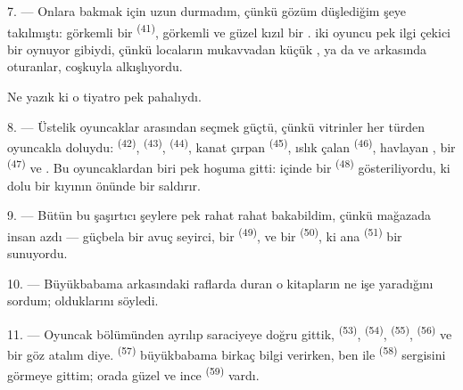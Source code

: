 7. --- Onlara bakmak için uzun durmadım, çünkü gözüm düşlediğim şeye
takılmıştı: görkemli bir  \textsuperscript{(41)},
görkemli  ve güzel kızıl bir .
 iki oyuncu pek ilgi çekici bir 
 oynuyor gibiydi, çünkü locaların mukavvadan küçük
, ya da  ve 
 arkasında oturanlar, coşkuyla alkışlıyordu.

Ne yazık ki o tiyatro pek pahalıydı.

8. --- Üstelik oyuncaklar arasından seçmek güçtü, çünkü vitrinler her türden
oyuncakla doluydu:  \textsuperscript{(42)},
 \textsuperscript{(43)}, 
\textsuperscript{(44)}, kanat çırpan 
\textsuperscript{(45)}, ıslık çalan 
\textsuperscript{(46)}, havlayan , bir 
\textsuperscript{(47)} ve . Bu oyuncaklardan biri pek
hoşuma gitti: içinde bir  \textsuperscript{(48)}
gösteriliyordu, ki  dolu bir kıyının
önünde  bir  saldırır.


9. --- Bütün bu şaşırtıcı şeylere pek rahat rahat bakabildim, çünkü mağazada
insan azdı --- güçbela bir avuç seyirci, bir 
\textsuperscript{(49)}, ve bir  \textsuperscript{(50)}, ki
ana  \textsuperscript{(51)} bir  sunuyordu.

10. --- Büyükbabama  arkasındaki raflarda duran o kitapların
ne işe yaradığını sordum;  olduklarını söyledi.

\VUsaut{3.6mm}
\VUsaut{2.8mm}

11. --- Oyuncak bölümünden ayrılıp saraciyeye doğru gittik, 
\textsuperscript{(53)},  \textsuperscript{(54)},
 \textsuperscript{(55)}, 
\textsuperscript{(56)} ve  bir göz atalım diye.
 \textsuperscript{(57)} büyükbabama birkaç bilgi verirken,
ben  ile  \textsuperscript{(58)} sergisini
görmeye gittim; orada güzel  ve ince
 \textsuperscript{(59)} vardı.

